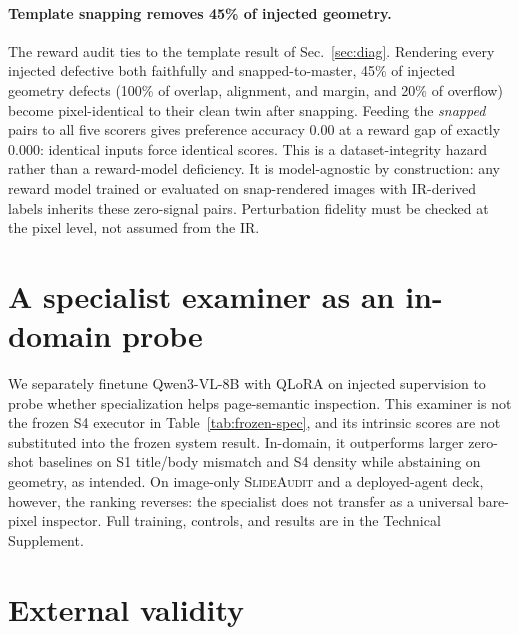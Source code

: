 \documentclass[letterpaper]{article}            %
\newcommand{\g}[1]{\textsf{#1}}        %
\begin{document}
\paragraph{Template snapping removes 45\% of injected geometry.}
The reward audit ties to the template result of Sec.~\ref{sec:diag}. Rendering every injected defective both
faithfully and snapped-to-master, 45\% of injected geometry defects (100\% of overlap, alignment, and margin, and 20\% of overflow) become pixel-identical to their clean twin after snapping. Feeding the \emph{snapped} pairs to all
five scorers gives preference accuracy 0.00 at a reward gap of exactly 0.000: identical inputs force identical
scores. This is a dataset-integrity hazard rather than a reward-model deficiency. It is model-agnostic by construction: any reward model trained or evaluated on snap-rendered images with IR-derived labels inherits
these zero-signal pairs. Perturbation fidelity must be checked at the pixel level, not assumed from the IR.

\section{A specialist examiner as an in-domain probe}\label{sec:examiner}

We separately finetune Qwen3-VL-8B with QLoRA on injected supervision to probe whether specialization helps
page-semantic inspection. This examiner is not the frozen \g{S4} executor in Table~\ref{tab:frozen-spec}, and
its intrinsic scores are not substituted into the frozen system result. In-domain, it outperforms larger
zero-shot baselines on \g{S1} title/body mismatch and \g{S4} density while abstaining on geometry, as intended.
On image-only \textsc{SlideAudit} and a deployed-agent deck, however, the ranking reverses: the specialist does
not transfer as a universal bare-pixel inspector. Full training, controls, and results are in the Technical
Supplement.

\section{External validity}\label{sec:external}
\end{document}
